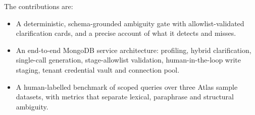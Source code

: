 The contributions are:
\begin{itemize}
\item A deterministic, schema-grounded ambiguity gate with allowlist-validated clarification cards, and a precise account of what it detects and misses.
\item An end-to-end MongoDB service architecture: profiling, hybrid clarification, single-call generation, stage-allowlist validation, human-in-the-loop write staging, tenant credential vault and connection pool.
\item A human-labelled benchmark of \numTotalQueries{} scoped queries over three Atlas sample datasets, with metrics that separate lexical, paraphrase and structural ambiguity.
\end{itemize}
